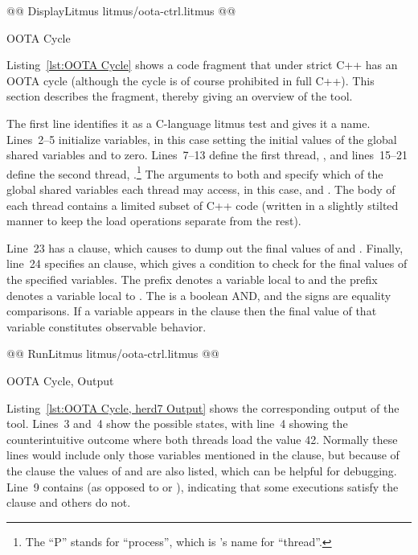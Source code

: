 \documentclass[10]{article}
\begin{document}
\begin{listing}[tbp]
@@ DisplayLitmus litmus/oota-ctrl.litmus @@
\caption{OOTA Cycle}
\label{lst:OOTA Cycle}
\end{listing}

Listing~\ref{lst:OOTA Cycle}
shows a code fragment that under strict C++ has an OOTA cycle (although
the cycle is of course prohibited in full C++).
This section describes the fragment, thereby giving an overview of
the  tool.

The first line identifies it as a C-language litmus test and gives it
a name.
Lines~2--5 initialize variables, in this case setting the initial
values of the global shared variables  and  to zero.
Lines~7--13 define the first thread, , and lines~15--21
define the second thread, .\footnote{
	The ``P'' stands for ``process'', which is 's name
	for ``thread''.}
The arguments to both  and  specify which of
the global shared variables each thread may access, in this case, 
and .
The body of each thread contains a limited subset of C++ code
(written in a slightly stilted manner to keep the load operations separate
from the rest).

Line~23 has a  clause, which causes
 to dump out the final values of  and .
Finally, line~24 specifies an  clause, which gives a
condition to check for the final values of the specified variables.
The  prefix denotes a variable local to  and
the  prefix denotes a variable local to .
The \co{/\\} is a boolean AND, and the \co{=} signs are equality comparisons.
If a variable appears in the  clause then the final value of
that variable constitutes observable behavior.

\begin{listing}[tbp]
@@ RunLitmus litmus/oota-ctrl.litmus @@
\caption{OOTA Cycle,  Output}
\label{lst:OOTA Cycle, herd7 Output}
\end{listing}

Listing~\ref{lst:OOTA Cycle, herd7 Output} shows the corresponding output
of the  tool.
Lines~3 and~4 show the possible states, with line~4 showing the
counterintuitive outcome where both threads load the value 42.
Normally these lines would include only those variables mentioned
in the  clause, but because of the  clause
the values of  and  are also listed, which
can be helpful for debugging.
Line~9 contains  (as opposed to  or ),
indicating that some executions satisfy the  clause and
others do not.
\end{document}
